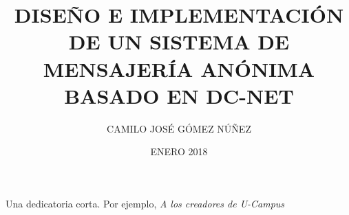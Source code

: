 \documentclass[upright, contnum]{umemoria}
\author{CAMILO JOSÉ GÓMEZ NÚÑEZ}
\title{DISEÑO E IMPLEMENTACIÓN DE UN SISTEMA DE MENSAJERÍA ANÓNIMA BASADO EN DC-NET}
\date{ENERO 2018}
\begin{document}
\frontmatter
\maketitle

\begin{abstract}

\end{abstract}

\begin{dedicatoria} %
Una dedicatoria corta. Por ejemplo, \emph{A los creadores de U-Campus}
\end{dedicatoria}

\begin{thanks} %
\lipsum[1-2]
\end{thanks}
\cleardoublepage

\tableofcontents

\mainmatter













\end{document}
